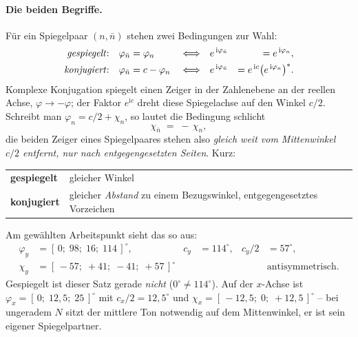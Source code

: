 \documentclass[11pt,a4paper]{article}
\begin{document}
\paragraph{Die beiden Begriffe.}
Für ein Spiegelpaar $(n,\bar n)$ stehen zwei Bedingungen zur Wahl:
\begin{align}
  \text{\emph{gespiegelt}:}&&  \varphi_{\bar n} &= \varphi_n
  &&\Longleftrightarrow&& e^{\,\mathrm{i}\varphi_{\bar n}} &= e^{\,\mathrm{i}\varphi_{n}} ,\\
  \text{\emph{konjugiert}:}&&  \varphi_{\bar n} &= c - \varphi_n
  &&\Longleftrightarrow&& e^{\,\mathrm{i}\varphi_{\bar n}} &= e^{\,\mathrm{i}c}\bigl(e^{\,\mathrm{i}\varphi_{n}}\bigr)^{*} .
\end{align}
Komplexe Konjugation spiegelt einen Zeiger in der Zahlenebene an der reellen
Achse, $\varphi\rightarrow-\varphi$; der Faktor $e^{\mathrm{i}c}$ dreht diese
Spiegelachse auf den Winkel $c/2$. Schreibt man
$\varphi_n = c/2 + \chi_n$, so lautet die Bedingung schlicht
\begin{equation}
  \chi_{\bar n} \;=\; -\,\chi_n ,
\end{equation}
die beiden Zeiger eines Spiegelpaares stehen also \emph{gleich weit vom
Mittenwinkel $c/2$ entfernt, nur nach entgegengesetzten Seiten}. Kurz:
\begin{center}
\begin{tabular}{@{}p{}p{}@{}}
  \toprule
  \textbf{gespiegelt} & gleicher Winkel\\
  \textbf{konjugiert} & gleicher \emph{Abstand} zu einem Bezugswinkel,
  entgegengesetztes Vorzeichen\\
  \bottomrule
\end{tabular}
\end{center}

Am gewählten Arbeitspunkt sieht das so aus:
\begin{align}
  \varphi_y &= [\,0;\;98;\;16;\;114\,]^\circ,
  & c_y &= 114^\circ,
  & c_y/2 &= 57^\circ, \nonumber\\
  \chi_y    &= [\,-57;\;+41;\;-41;\;+57\,]^\circ
  &&&& \text{antisymmetrisch.}
\end{align}
Gespiegelt ist dieser Satz gerade \emph{nicht} ($0^\circ \neq 114^\circ$).
Auf der $x$-Achse ist $\varphi_x=[\,0;\;12{,}5;\;25\,]^\circ$ mit
$c_x/2 = 12{,}5^\circ$ und $\chi_x=[\,-12{,}5;\;0;\;+12{,}5\,]^\circ$ -- bei
ungeradem $N$ sitzt der mittlere Ton notwendig auf dem Mittenwinkel, er ist
sein eigener Spiegelpartner.
\end{document}
